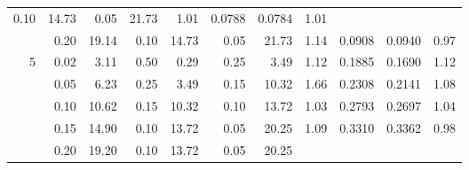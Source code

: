 \begin{table}[!htbp]
\begin{tabular}{r r r r r r r c r r c}
    0.10                                                &
    14.73                                               & 0.05     & 21.73
                                                        & 1.01     & 0.0788
                                                        & 0.0784   & 1.01
    \\
                                                        & 0.20     & 19.14               &
    0.10                                                &
    14.73                                               & 0.05     & 21.73
                                                        & 1.14     & 0.0908
                                                        & 0.0940   & 0.97
    \\
    \midrule
    5                                                   & 0.02     & 3.11                &
    0.50                                                &
    0.29                                                & 0.25     & 3.49
                                                        & 1.12     & 0.1885
                                                        & 0.1690   & 1.12
    \\
                                                        & 0.05     & 6.23                &
    0.25                                                &
    3.49                                                & 0.15     & 10.32
                                                        & 1.66     & 0.2308
                                                        & 0.2141   & 1.08
    \\
                                                        & 0.10     & 10.62               &
    0.15                                                &
    10.32                                               & 0.10     & 13.72
                                                        & 1.03     & 0.2793
                                                        & 0.2697   & 1.04
    \\
                                                        & 0.15     & 14.90               &
    0.10                                                &
    13.72                                               & 0.05     & 20.25
                                                        & 1.09     & 0.3310
                                                        & 0.3362   & 0.98
    \\
                                                        & 0.20     & 19.20               &
    0.10                                                &
    13.72                                               & 0.05     & 20.25

\end{tabular}
\end{table}
